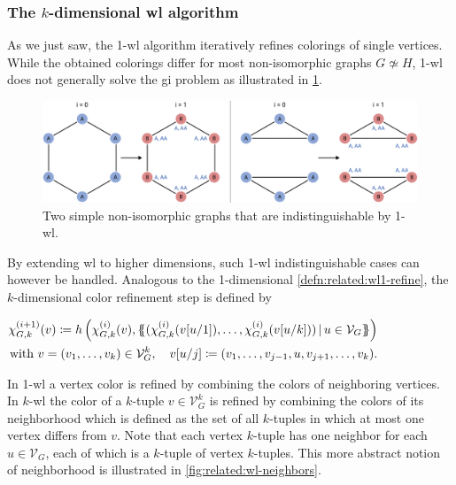 \subsubsection{The $k$-dimensional \acs{wl} algorithm}
As we just saw, the 1-\acs{wl} algorithm iteratively refines colorings of single vertices.
While the obtained colorings differ for most non-isomorphic graphs $G \not\simeq H$, 1-\acs{wl} does not generally solve the \ac{gi} problem as illustrated in \cref{fig:related:wl1-problem}.
\begin{figure}[ht]
	\centering
	\includegraphics[width=\linewidth]{gfx/related-work/wl1-problem.pdf}
	\caption[Two simple non-isomorphic graphs that are indistinguishable by 1-\acs{wl}.]{
		Two simple non-isomorphic graphs that are indistinguishable by 1-\acs{wl}.
	}\label{fig:related:wl1-problem}
\end{figure}
By extending \ac{wl} to higher dimensions, such 1-\acs{wl} indistinguishable cases can however be handled.
Analogous to the 1-dimensional \cref{defn:related:wl1-refine}, the $k$-dimensional color refinement step is defined by
\begin{defn}\label{defn:related:wlk-refine}
	$\begin{aligned}[t]
		\chi_{G,k}^{(i+1)}(v) \coloneqq h\left(\chi_{G,k}^{(i)}(v), \ldblbrace (\chi_{G,k}^{(i)}(v[u/1]), \dots, \chi_{G,k}^{(i)}(v[u/k]))\, |\, u \in \mathcal{V}_G \rdblbrace\right)\\
		\text{with } v = (v_1, \dots, v_k) \in \mathcal{V}_G^k,\quad v[u/j] \coloneqq (v_1, \dots, v_{j-1}, u, v_{j+1}, \dots, v_k) \text{.}
	\end{aligned}$
\end{defn}
In 1-\acs{wl} a vertex color is refined by combining the colors of neighboring vertices.
In $k$-\acs{wl} the color of a $k$-tuple $v \in \mathcal{V}_G^k$ is refined by combining the colors of its neighborhood which is defined as the set of all $k$-tuples in which at most one vertex differs from $v$.
Note that each vertex $k$-tuple has one neighbor for each $u \in \mathcal{V}_G$, each of which is a $k$-tuple of vertex $k$-tuples.
This more abstract notion of neighborhood is illustrated in \cref{fig:related:wl-neighbors}.
